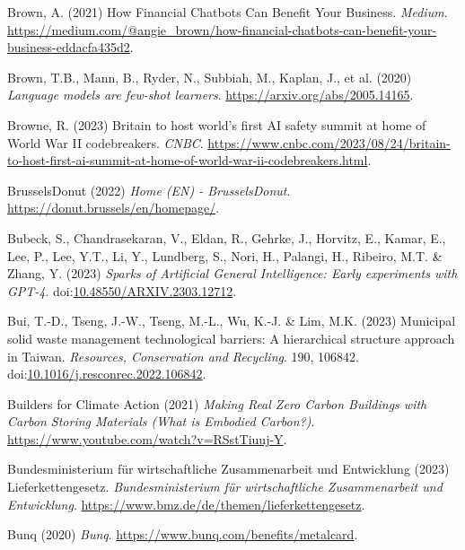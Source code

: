 \documentclass[
  letterpaper,
  DIV=11,
  numbers=noendperiod]{scrartcl}
\newlength{\cslhangindent}
\newenvironment{CSLReferences}[2] %
 {\begin{list}{}{%
  \setlength{\itemindent}{0pt}
  \setlength{\leftmargin}{0pt}
  \setlength{\parsep}{0pt}
  \ifodd #1
   \setlength{\leftmargin}{\cslhangindent}
   \setlength{\itemindent}{-1\cslhangindent}
  \fi
  \setlength{\itemsep}{#2\baselineskip}}}
 {\end{list}}
\begin{document}
\begin{CSLReferences}{0}{1}
Brown, A. (2021) How {Financial Chatbots Can Benefit Your Business}.
\emph{Medium}.
\url{https://medium.com/@angie_brown/how-financial-chatbots-can-benefit-your-business-eddacfa435d2}.

Brown, T.B., Mann, B., Ryder, N., Subbiah, M., Kaplan, J., et al. (2020)
\emph{Language models are few-shot learners}.
\url{https://arxiv.org/abs/2005.14165}.

Browne, R. (2023) Britain to host world's first {AI} safety summit at
home of {World War II} codebreakers. \emph{CNBC}.
\url{https://www.cnbc.com/2023/08/24/britain-to-host-first-ai-summit-at-home-of-world-war-ii-codebreakers.html}.

BrusselsDonut (2022) \emph{Home ({EN}) - {BrusselsDonut}}.
\url{https://donut.brussels/en/homepage/}.

Bubeck, S., Chandrasekaran, V., Eldan, R., Gehrke, J., Horvitz, E.,
Kamar, E., Lee, P., Lee, Y.T., Li, Y., Lundberg, S., Nori, H., Palangi,
H., Ribeiro, M.T. \& Zhang, Y. (2023) \emph{Sparks of {Artificial
General Intelligence}: {Early} experiments with {GPT-4}}.
doi:\href{https://doi.org/10.48550/ARXIV.2303.12712}{10.48550/ARXIV.2303.12712}.

Bui, T.-D., Tseng, J.-W., Tseng, M.-L., Wu, K.-J. \& Lim, M.K. (2023)
Municipal solid waste management technological barriers: {A}
hierarchical structure approach in {Taiwan}. \emph{Resources,
Conservation and Recycling}. 190, 106842.
doi:\href{https://doi.org/10.1016/j.resconrec.2022.106842}{10.1016/j.resconrec.2022.106842}.

Builders for Climate Action (2021) \emph{Making {Real Zero Carbon
Buildings} with {Carbon Storing Materials} ({What} is {Embodied
Carbon}?)}. \url{https://www.youtube.com/watch?v=RSstTiuuj-Y}.

Bundesministerium für wirtschaftliche Zusammenarbeit und Entwicklung
(2023) {Lieferkettengesetz}. \emph{Bundesministerium f{ü}r
wirtschaftliche Zusammenarbeit und Entwicklung}.
\url{https://www.bmz.de/de/themen/lieferkettengesetz}.

Bunq (2020) \emph{Bunq}. \url{https://www.bunq.com/benefits/metalcard}.


\end{CSLReferences}
\end{document}

